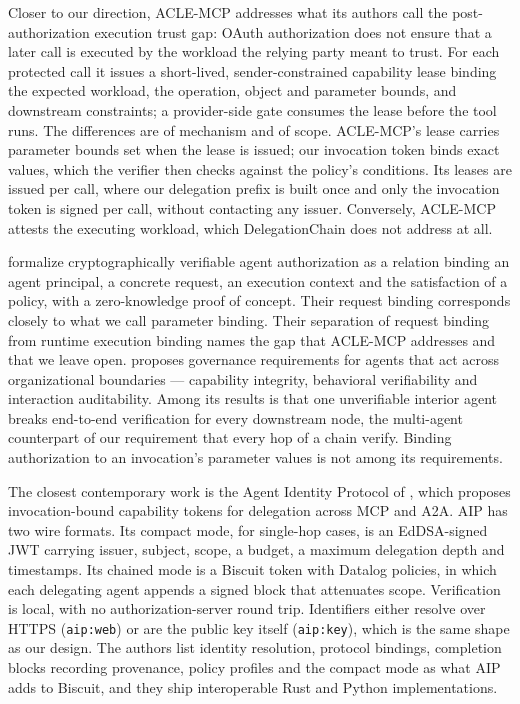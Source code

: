 \documentclass[11pt,a4paper]{article}
\begin{document}
Closer to our direction, ACLE-MCP \citep{ding2026aclemcp} addresses what
its authors call the post-authorization execution trust gap: OAuth
authorization does not ensure that a later call is executed by the
workload the relying party meant to trust. For each protected call it
issues a short-lived, sender-constrained capability lease binding the
expected workload, the operation, object and parameter bounds, and
downstream constraints; a provider-side gate consumes the lease before
the tool runs. The differences are of mechanism and of scope. ACLE-MCP's
lease carries parameter bounds set when the lease is issued; our
invocation token binds exact values, which the verifier then checks
against the policy's conditions. Its leases are issued per call, where
our delegation prefix is built once and only the invocation token is
signed per call, without contacting any issuer. Conversely, ACLE-MCP
attests the executing workload, which DelegationChain does not address
at all.

\citet{llambi2026cva} formalize cryptographically verifiable agent
authorization as a relation binding an agent principal, a concrete
request, an execution context and the satisfaction of a policy, with a
zero-knowledge proof of concept. Their request binding corresponds
closely to what we call parameter binding. Their separation of request
binding from runtime execution binding names the gap that ACLE-MCP
addresses and that we leave open. \citet{zhouz2026governing} proposes
governance requirements for agents that act across organizational
boundaries --- capability integrity, behavioral verifiability and
interaction auditability. Among its results is that one unverifiable
interior agent breaks end-to-end verification for every downstream node,
the multi-agent counterpart of our requirement that every hop of a chain
verify. Binding authorization to an invocation's parameter values is not
among its requirements.

The closest contemporary work is the Agent Identity Protocol of
\citet{prakash2026aip}, which proposes invocation-bound capability
tokens for delegation across MCP and A2A. AIP has two wire formats. Its
compact mode, for single-hop cases, is an EdDSA-signed JWT carrying
issuer, subject, scope, a budget, a maximum delegation depth and
timestamps. Its chained mode is a Biscuit token with Datalog policies,
in which each delegating agent appends a signed block that attenuates
scope. Verification is local, with no authorization-server round trip.
Identifiers either resolve over HTTPS (\texttt{aip:web}) or are the
public key itself (\texttt{aip:key}), which is the same shape as our
design. The authors list identity resolution, protocol bindings,
completion blocks recording provenance, policy profiles and the compact
mode as what AIP adds to Biscuit, and they ship interoperable Rust and
Python implementations.
\end{document}
